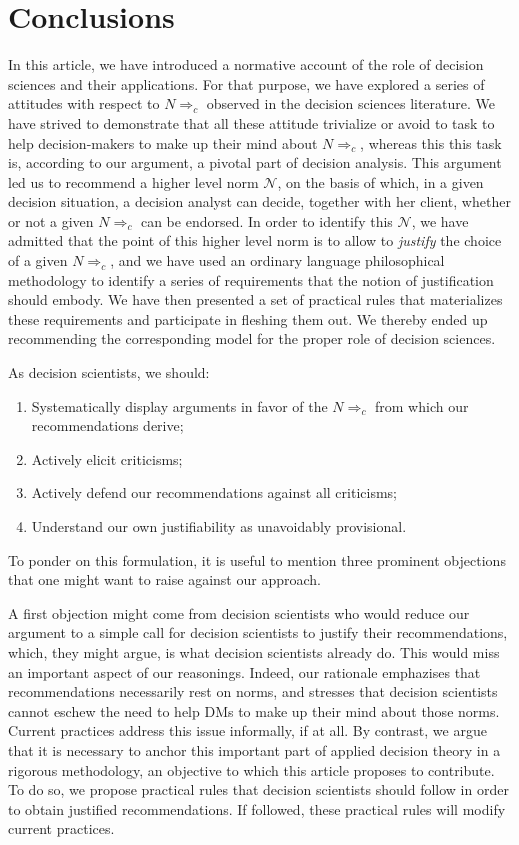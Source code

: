 \documentclass[preprint, french, english, 11pt, authoryear]{elsarticle}%
\newcommand{\adv}{\mathscr{N}}
\begin{document}
\section{Conclusions}
In this article, we have introduced a normative account of the role of decision sciences and their applications. For that purpose, we have explored a series of attitudes with respect to $N ⇒_c$ observed in the decision sciences literature. We have strived to demonstrate that all these attitude trivialize or avoid to task to help decision-makers to make up their mind about $N ⇒_c$, whereas this this task is, according to our argument, a pivotal part of decision analysis. This argument led us to recommend a higher level norm $\adv$, on the basis of which, in a given decision situation, a decision analyst can decide, together with her client, whether or not a given $N ⇒_c$ can be endorsed. In order to identify this $\adv$, we have admitted that the point of this higher level norm is to allow to \emph{justify} the choice of a given $N ⇒_c$, and we have used an ordinary language philosophical methodology to identify a series of requirements that the notion of justification should embody. We have then presented a set of practical rules that materializes these requirements and participate in fleshing them out. We thereby ended up recommending the corresponding model for the proper role of decision sciences.

As decision scientists, we should:
\begin{enumerate}[label=\roman*.]
	\item Systematically display arguments in favor of the $N ⇒_c$ from which our recommendations derive;
	\item Actively elicit criticisms;
	\item Actively defend our recommendations against all criticisms;
	\item Understand our own justifiability as unavoidably provisional.
\end{enumerate}

To ponder on this formulation, it is useful to mention three prominent objections that one might want to raise against our approach.

A first objection might come from decision scientists who would reduce our argument to a simple call for decision scientists to justify their recommendations, which, they might argue, is what decision scientists already do. This would miss an important aspect of our reasonings. Indeed, our rationale emphazises that recommendations necessarily rest on norms, and stresses that decision scientists cannot eschew the need to help \acp{DM} to make up their mind about those norms. Current practices address this issue informally, if at all. By contrast, we argue that it is necessary to anchor this important part of applied decision theory in a rigorous methodology, an objective to which this article proposes to contribute. To do so, we propose practical rules that decision scientists should follow in order to obtain justified recommendations. If followed, these practical rules will modify current practices.
\end{document}

